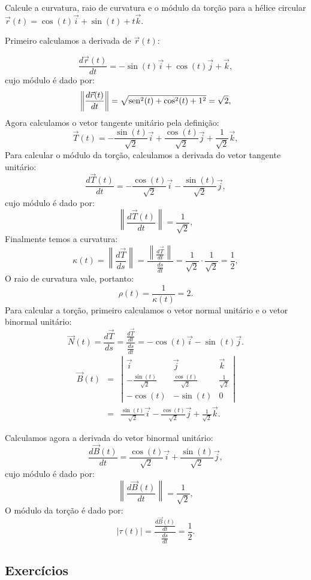 \begin{exeresol} Calcule a curvatura, raio de curvatura e o módulo da torção para a hélice circular $\vec{r}(t)=\cos(t)\vec{i}+\sin(t)+t\vec{k}$.
\end{exeresol}
Primeiro calculamos a derivada de $\vec{r}(t)$:
\begin{resol}
$$
\frac{d\vec{r}(t)}{dt}=-\sin(t)\vec{i}+\cos(t)\vec{j}+\vec{k},
$$
cujo módulo é dado por:
$$
\left\|\frac{d\vec{r}(t)}{dt}\right\|=\sqrt{\operatorname{sen}^2(t)+\cos^2(t)+1^2}=\sqrt{2},
$$
Agora calculamos o vetor tangente unitário pela definição:
$$
\vec{T}(t)=-\frac{\sin(t)}{\sqrt{2}}\vec{i}+\frac{\cos(t)}{\sqrt{2}}\vec{j}+\frac{1}{\sqrt{2}}\vec{k},
$$
Para calcular o módulo da torção, calculamos a derivada do vetor tangente unitário:
$$
\frac{d\vec{T}(t)}{dt}=-\frac{\cos(t)}{\sqrt{2}}\vec{i}-\frac{\sin(t)}{\sqrt{2}}\vec{j},
$$
cujo módulo é dado por:
$$
\left\|\frac{d\vec{T}(t)}{dt}\right\|=\frac{1}{\sqrt{2}},
$$
Finalmente temos a curvatura:
$$
\kappa(t)=\left\|\frac{d\vec{T}}{ds}\right\|=\frac{\left\|\frac{d\vec{T}}{dt}\right\|}{\frac{ds}{dt}} = \frac{1}{\sqrt{2}}\cdot \frac{1}{\sqrt{2}}=\frac{1}{2},
$$
O raio de curvatura vale, portanto:
$$
\rho(t)=\frac{1}{\kappa(t)}=2.
$$
Para calcular a torção, primeiro calculamos o vetor normal unitário e o vetor binormal unitário:
$$
\vec{N}(t)=\frac{d\vec{T}}{ds} = \frac{\frac{d\vec{T}}{dt}}{\frac{ds}{dt}}=-\cos(t)\vec{i}-\sin(t)\vec{j}.
$$
\begin{eqnarray*}
\vec{B}(t)&=&\left|\begin{array}{ccc}\vec{i}&\vec{j}&\vec{k}\\-\frac{\sin(t)}{\sqrt{2}}&\frac{\cos(t)}{\sqrt{2}}&\frac{1}{\sqrt{2}}\\-\cos(t)&-\sin(t)&0\end{array}\right|\\
&=&\frac{\sin(t)}{\sqrt{2}}\vec{i}-\frac{\cos(t)}{\sqrt{2}}\vec{j}+\frac{1}{\sqrt{2}}\vec{k}.
\end{eqnarray*}

Calculamos agora a derivada do vetor binormal unitário:
$$
\frac{d\vec{B}(t)}{dt}=\frac{\cos(t)}{\sqrt{2}}\vec{i}+\frac{\sin(t)}{\sqrt{2}}\vec{j},
$$
cujo módulo é dado por:
$$
\left\|\frac{d\vec{B}(t)}{dt}\right\|=\frac{1}{\sqrt{2}},
$$
O módulo da torção é dado por:
$$
|\tau(t)|=\frac{\frac{d\vec{B}(t)}{dt}}{\frac{ds}{dt}}=\frac{1}{2}.
$$
\end{resol}

\subsection*{Exercícios}

